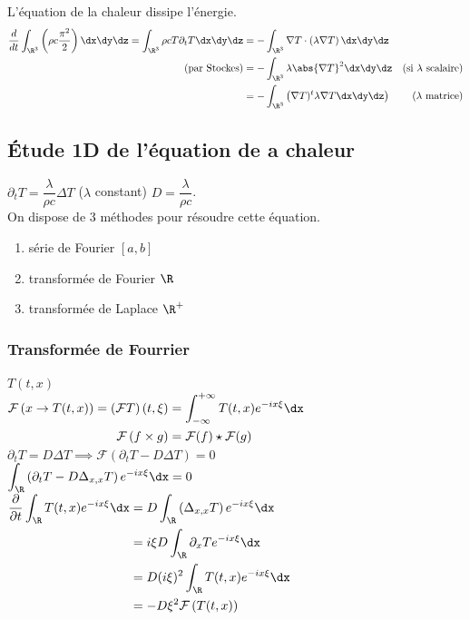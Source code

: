 \documentclass[12pt,a4paper]{article}
\begin{document}
L'équation de la chaleur dissipe l'énergie.
\[
\begin{aligned}
	\displaystyle\dfrac d{dt}\int_{\R^3}\left(\rho c \dfrac{\pi^2}2\right)\dx\dy\dz = \int_{\R^3} \rho c T\partial_t T \dx\dy\dz &= -\int_{\R^3} \nabla T \cdot\left(\lambda\nabla T\right)\dx\dy\dz\\
	\text{(par Stockes)} & =-\int_{\R^3}\lambda\abs{\nabla T}^2\dx\dy\dz & \text{(si $\lambda$ scalaire)}\\
	&=-\int_{\R^3} \left(\nabla T)^t\lambda\nabla T \dx\dy\dz\right) & \text{($\lambda$ matrice)}
\end{aligned}
\]

\subsection{Étude 1D de l'équation de a chaleur}

$\partial_t T = \dfrac\lambda{\rho c}\Delta T$ \hspace{1cm} ($\lambda$ constant) \hspace{1cm} $D = \dfrac\lambda{\rho c}$.\\
On dispose de 3 méthodes pour résoudre cette équation.
\begin{enumerate}[label=$\to$]
	\item série de Fourier \hspace{1cm} $[a,b]$
	
	\item transformée de Fourier \hspace{1cm} $\R$ 
	
	\item transformée de Laplace \hspace{1cm} $\R^+$
\end{enumerate}

\subsubsection{Transformée de Fourrier}

$T(t,x)$\\
$\begin{aligned}
	\mathcal F\left(x\to T(t,x)\right) = \left(\mathcal F T\right)(t,\xi) &= \int_{-\infty}^{+\infty} T(t,x) e^{-ix\xi}\dx\\
	 \mathcal F\left(f\times g\right) &= \mathcal F(f) \star \mathcal F(g)
\end{aligned}$\\

$\partial_t T = D\Delta T \implies \mathcal F\left(\partial_t T - D\Delta T\right) = 0$\\
$\displaystyle\int_\R\left(\partial_t T-D\Delta_{x,x}T\right)e^{-ix\xi}\dx = 0$\\
$\begin{aligned}
	\dfrac\partial{\partial t} \int_\R T(t,x)e^{-ix\xi}\dx &=D\int_\R\left(\Delta_{x,x} T\right) e^{-ix\xi}\dx \\
	&=i\xi D\int_\R\partial_x T e^{-ix\xi}\dx\\
	&= D(i\xi)^2\int_\R T(t,x)e^{-ix\xi}\dx\\
	&=-D\xi^2\mathcal F\left(T(t,x)\right)
\end{aligned}$\\
\end{document}
